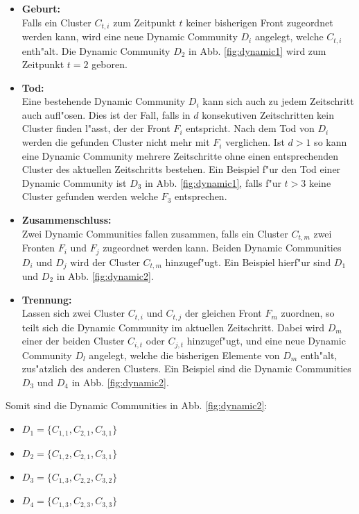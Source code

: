 \documentclass[journal]{vgtc}
\begin{document}
    \begin{itemize}
      \item \textbf{Geburt:} \hfill \\
	    Falls ein Cluster $C_{t,i}$ zum Zeitpunkt $t$ keiner bisherigen Front zugeordnet werden kann, wird eine neue Dynamic Community
	    $D_i$ angelegt, welche $C_{t,i}$ enth"alt. Die Dynamic Community $D_2$ in Abb. \ref{fig:dynamic1} wird zum Zeitpunkt $t=2$ geboren. 
      \item \textbf{Tod:} \hfill \\
	    Eine bestehende Dynamic Community $D_i$ kann sich auch zu jedem Zeitschritt auch aufl"osen. Dies ist der Fall, falls in $d$ konsekutiven
	    Zeitschritten kein Cluster finden l"asst, der der Front $F_i$ entspricht. Nach dem Tod von $D_i$ werden die gefunden Cluster nicht mehr mit
	    $F_i$ verglichen. Ist $d>1$ so kann eine Dynamic Community mehrere Zeitschritte ohne einen entsprechenden Cluster des aktuellen Zeitschritts bestehen.
	    Ein Beispiel f"ur den Tod einer Dynamic Community ist $D_3$ in Abb. \ref{fig:dynamic1}, falls f"ur $t>3$ keine Cluster gefunden werden welche $F_3$ entsprechen.
      \item \textbf{Zusammenschluss:} \hfill \\
	    Zwei Dynamic Communities fallen zusammen, falls ein Cluster $C_{t,m}$ zwei Fronten $F_i$ und $F_j$ zugeordnet werden kann. Beiden Dynamic Communities
	    $D_i$ und $D_j$ wird der Cluster $C_{t,m}$ hinzugef"ugt. Ein Beispiel hierf"ur sind $D_1$ und $D_2$ in Abb. \ref{fig:dynamic2}.
      \item \textbf{Trennung:} \hfill \\
	    Lassen sich zwei Cluster $C_{t,i}$ und $C_{t,j}$ der gleichen Front $F_m$ zuordnen, so teilt sich die Dynamic Community im aktuellen Zeitschritt.
	    Dabei wird $D_m$ einer der beiden Cluster $C_{i,t}$ oder $C_{j,t}$ hinzugef"ugt, und eine neue Dynamic Community $D_l$ angelegt, welche die bisherigen
	    Elemente von $D_m$ enth"alt, zus"atzlich des anderen Clusters.
	    Ein Beispiel sind die Dynamic Communities $D_3$ und $D_4$ in Abb. \ref{fig:dynamic2}.
    \end{itemize}
    Somit sind die Dynamic Communities in Abb. \ref{fig:dynamic2}:
    \begin{itemize}
      \item $D_1 =\{C_{1,1}, C_{2,1}, C_{3,1}\}$
      \item $D_2 =\{C_{1,2}, C_{2,1}, C_{3,1}\}$
      \item $D_3 =\{C_{1,3}, C_{2,2}, C_{3,2}\}$
      \item $D_4 =\{C_{1,3},C_{2,3}, C_{3,3}\}$
    \end{itemize}
\end{document}
